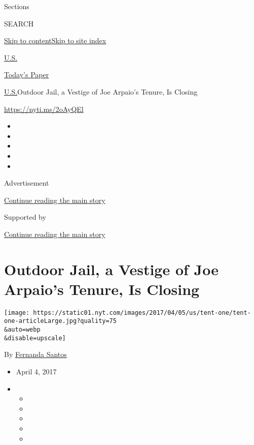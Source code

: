 Sections

SEARCH

\protect\hyperlink{site-content}{Skip to
content}\protect\hyperlink{site-index}{Skip to site index}

\href{https://www.nytimes.com/section/us}{U.S.}

\href{https://myaccount.nytimes.com/auth/login?response_type=cookie\&client_id=vi}{}

\href{https://www.nytimes.com/section/todayspaper}{Today's Paper}

\href{/section/us}{U.S.}\textbar{}Outdoor Jail, a Vestige of Joe
Arpaio's Tenure, Is Closing

\url{https://nyti.ms/2oAyQEl}

\begin{itemize}
\item
\item
\item
\item
\item
\end{itemize}

Advertisement

\protect\hyperlink{after-top}{Continue reading the main story}

Supported by

\protect\hyperlink{after-sponsor}{Continue reading the main story}

\hypertarget{outdoor-jail-a-vestige-of-joe-arpaios-tenure-is-closing}{%
\section{Outdoor Jail, a Vestige of Joe Arpaio's Tenure, Is
Closing}\label{outdoor-jail-a-vestige-of-joe-arpaios-tenure-is-closing}}

\texttt{[image: https://static01.nyt.com/images/2017/04/05/us/tent-one/tent-one-articleLarge.jpg?quality=75\\\&auto=webp\\\&disable=upscale]}

By \href{http://www.nytimes.com/by/fernanda-santos}{Fernanda Santos}

\begin{itemize}
\item
  April 4, 2017
\item
  \begin{itemize}
  \item
  \item
  \item
  \item
  \item
  \end{itemize}
\end{itemize}

